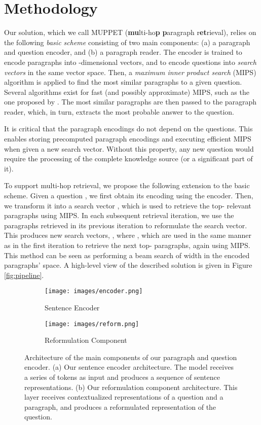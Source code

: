 \documentclass[11pt,a4paper,dvipsnames]{article}
\begin{document}
\section{Methodology}
Our solution, which we call MUPPET (\textbf{mu}lti-ho\textbf{p} \textbf{p}aragraph r\textbf{et}rieval), relies on the following \emph{basic scheme} consisting of two main components: (a) a paragraph and question encoder, and (b) a paragraph reader. The encoder is trained to encode paragraphs into -dimensional vectors, and to encode questions into \emph{search vectors} in the same vector space. Then, a \emph{maximum inner product search} (MIPS) algorithm is applied to find the most similar paragraphs to a given question. Several algorithms exist for fast (and possibly approximate) MIPS, such as the one proposed by \citet{JohnsonDJ17faiss}.  The most similar paragraphs are then passed to the paragraph reader, which, in turn, extracts the most probable answer to the question. \par
It is critical that the paragraph encodings do not depend on the questions. This enables storing precomputed paragraph encodings and executing efficient MIPS when given a new search vector. Without this property, any new question would require the processing of the complete knowledge source (or a significant part of it). \par

To support multi-hop retrieval, we propose the following extension to the basic scheme. Given a question , we first obtain its encoding  using the encoder. Then, we transform it into a search vector , which is used to retrieve the top- relevant paragraphs  using MIPS. In each subsequent retrieval iteration, we use the paragraphs retrieved in its previous iteration to reformulate the search vector. This produces  new search vectors, , where , which are used in the same manner as in the first iteration to retrieve the next top- paragraphs, again using MIPS.
This method can be seen as performing a beam search of width  in the encoded paragraphs' space. A high-level view of the described solution is given in Figure \ref{fig:pipeline}. \par

\begin{figure}[h]
\centering
\begin{subfigure}{0.4\linewidth}
\centering
\texttt{[image: images/encoder.png]}
\caption{Sentence Encoder}
\label{fig:encoder}
\end{subfigure}
\hspace{0.1cm}
\begin{subfigure}{0.5\linewidth}
\centering
\texttt{[image: images/reform.png]}
\caption{Reformulation Component}
\label{fig:reform}
\end{subfigure}
\caption{Architecture of the main components of our paragraph and question encoder. (a) Our sentence encoder architecture. The model receives a series of tokens as input and produces a sequence of sentence representations. (b) Our reformulation component architecture. This layer receives contextualized representations of a question and a paragraph, and produces a reformulated representation of the question.}
\label{fig:architectures}
\end{figure}
\end{document}
